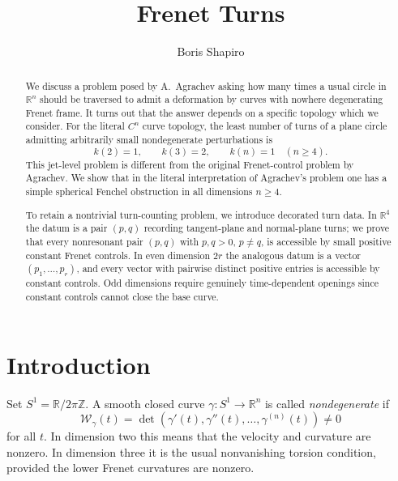 \documentclass[11pt,reqno]{amsart}
\theoremstyle{definition}
\theoremstyle{remark}
\newcommand{\R}{\mathbb R}
\newcommand{\W}{\mathcal W}
\begin{document}
\title[Frenet turns]{Frenet Turns}

\author[Boris Shapiro]{Boris Shapiro}
\address{Department of Mathematics, Stockholm University, SE-106 91 Stockholm, Sweden}

\begin{abstract}
We discuss a problem posed by A.~Agrachev asking how many times a usual circle in $\mathbb R^n$ should be traversed to admit a deformation by curves with nowhere degenerating Frenet frame. It turns out that the answer depends on a specific topology which we consider.   
For the literal $C^n$ curve topology, the least number of turns of a plane circle
admitting arbitrarily small nondegenerate perturbations is
\[
        k(2)=1,\qquad k(3)=2,\qquad k(n)=1\quad(n\ge4).
\]
This jet-level problem is different from the original Frenet-control problem by Agrachev.  We
show that in the literal interpretation of Agrachev's problem  one has a simple
spherical Fenchel obstruction in all dimensions $n\ge4$.

To retain a nontrivial turn-counting problem, we introduce decorated turn data.  In
$\R^4$ the datum is a pair $(p,q)$ recording tangent-plane and normal-plane turns; we
prove that every nonresonant pair $(p,q)$ with  $p,q>0$, $p\ne q$, is accessible by small positive
constant Frenet controls.  In even dimension $2r$ the analogous datum is a vector
$(p_1,\ldots,p_r)$, and every vector with pairwise distinct positive entries is
accessible by constant controls.  Odd dimensions require genuinely time-dependent
openings since constant controls cannot close the base curve.
\end{abstract}


\maketitle

\section{Introduction}

Set $S^1=\R/2\pi\mathbb Z$.  A smooth closed curve $\gamma:S^1\to\R^n$ is called 
\emph{nondegenerate} if
\begin{equation}\label{eq:Wronskian}
        \W_\gamma(t)=\det(\gamma'(t),\gamma''(t),\ldots,\gamma^{(n)}(t))
        \ne0
\end{equation}
for all $t$.  In dimension two this means that the velocity and curvature are
nonzero.  In dimension three it is the usual nonvanishing torsion condition, provided
the lower Frenet curvatures are nonzero.
\end{document}
